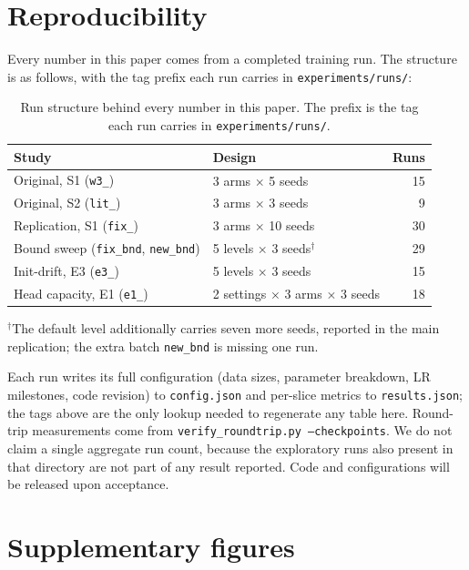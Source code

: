 \documentclass[conference]{IEEEtran}
\begin{document}
\section*{Reproducibility}
Every number in this paper comes from a completed training run. The structure is
as follows, with the tag prefix each run carries in \texttt{experiments/runs/}:

\begin{table}[t]
\centering
\caption{Run structure behind every number in this paper. The prefix is the tag
each run carries in \texttt{experiments/runs/}.}
\label{tab:runs}
\small
\begin{tabular}{@{}llr@{}}
\toprule
Study & Design & Runs\\
\midrule
Original, S1 (\texttt{w3\_}) & 3 arms $\times$ 5 seeds & 15\\
Original, S2 (\texttt{lit\_}) & 3 arms $\times$ 3 seeds & 9\\
Replication, S1 (\texttt{fix\_}) & 3 arms $\times$ 10 seeds & 30\\
Bound sweep (\texttt{fix\_bnd}, \texttt{new\_bnd}) & 5 levels $\times$ 3 seeds$^{\dagger}$ & 29\\
Init-drift, E3 (\texttt{e3\_}) & 5 levels $\times$ 3 seeds & 15\\
Head capacity, E1 (\texttt{e1\_}) & 2 settings $\times$ 3 arms $\times$ 3 seeds & 18\\
\bottomrule
\end{tabular}
\end{table}

$^{\dagger}$The default level additionally carries seven more seeds, reported in
the main replication; the extra batch \texttt{new\_bnd} is missing one run.

Each run writes its full configuration (data sizes, parameter breakdown, LR
milestones, code revision) to \texttt{config.json} and per-slice metrics to
\texttt{results.json}; the tags above are the only lookup needed to regenerate any
table here. Round-trip measurements come from
\texttt{verify\_roundtrip.py --checkpoints}. We do not claim a single aggregate
run count, because the exploratory runs also present in that directory are not
part of any result reported. Code and configurations will be released upon
acceptance.

\section*{Supplementary figures}
\end{document}
